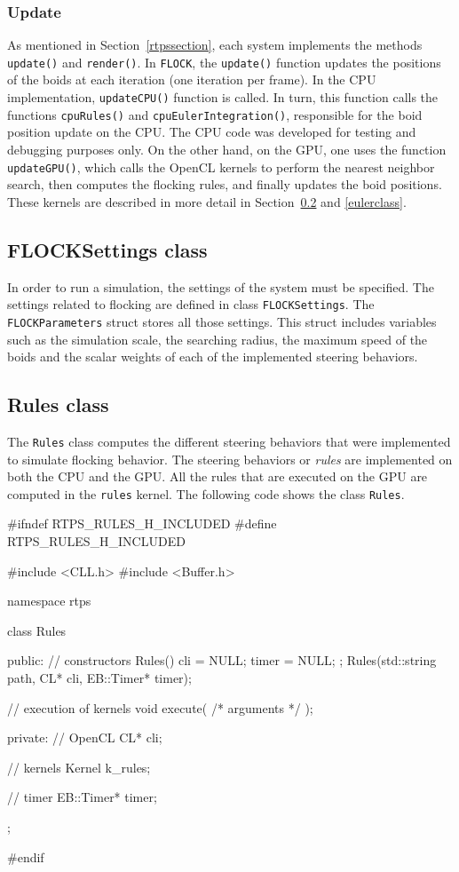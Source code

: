 \subsubsection{Update}
As mentioned in Section~\ref{rtpssection}, each system implements the methods \texttt{update()} and \texttt{render()}. In \texttt{FLOCK}, the \texttt{update()} function updates the positions of the boids at each iteration (one iteration per frame). In the CPU implementation, \texttt{updateCPU()} function is called. In turn, this function calls the functions \texttt{cpuRules()} and \texttt{cpuEulerIntegration()}, responsible for the boid position update on the CPU. The CPU code was developed for testing and debugging purposes only. On the other hand, on the GPU, one uses the function \texttt{updateGPU()}, which calls the OpenCL kernels to perform the nearest neighbor search, then computes the flocking rules, and finally updates the boid positions. These kernels are described in more detail in Section~\ref{rulesclass} and \ref{eulerclass}.

\subsection{FLOCKSettings class}
In order to run a simulation, the settings of the system must be specified. The settings related to flocking are defined in class \texttt{FLOCKSettings}. The \texttt{FLOCKParameters} struct stores all those settings. This struct includes variables such as the simulation scale, the searching radius, the maximum speed of the boids and the scalar weights of each of the implemented steering behaviors. 

\subsection{Rules class}\label{rulesclass}
The \texttt{Rules} class computes the different steering behaviors that were implemented to simulate flocking behavior. The steering behaviors or \textit{rules} are implemented on both the CPU and the GPU. All the rules that are executed on the GPU are computed in the \texttt{rules} kernel. The following code shows the class \texttt{Rules}.

\begin{cppcode}{0}
#ifndef RTPS_RULES_H_INCLUDED
#define RTPS_RULES_H_INCLUDED

#include <CLL.h>
 #include <Buffer.h>

namespace rtps
 {
	class Rules
	{
		public:
			// constructors
			Rules() { cli = NULL; timer = NULL; };
			Rules(std::string path, CL* cli, EB::Timer* timer);
			
			// execution of kernels
			void execute( /* arguments */ );
			
		private:
			// OpenCL
			CL* cli;
			
			// kernels
			Kernel k_rules;
			
			// timer
			EB::Timer* timer;
	};
}
#endif
\end{cppcode}

